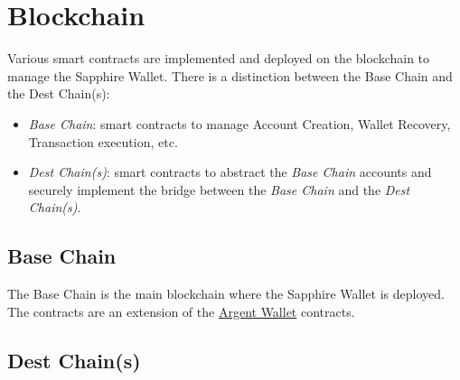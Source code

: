 \section{Blockchain}
\label{sec:blockchain}

Various smart contracts are implemented  and deployed on the blockchain to manage the Sapphire Wallet. There is a distinction between the Base Chain and the Dest Chain(s):
\begin{itemize}
    \item \textit{Base Chain}: smart contracts to manage Account Creation, Wallet Recovery, Transaction execution, etc.
    \item \textit{Dest Chain(s)}: smart contracts to abstract the \textit{Base Chain} accounts and securely implement the bridge between the \textit{Base Chain} and the \textit{Dest Chain(s)}. 
\end{itemize}

\subsection{Base Chain}
\label{subsec:base_chain}

The Base Chain is the main blockchain where the Sapphire Wallet is deployed. The contracts are an extension of the \hyperref[subsec:argent]{Argent Wallet} contracts. 

\subsection{Dest Chain(s)}
\label{subsec:dest_chain(s)} 
